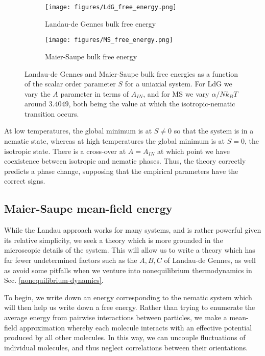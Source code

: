 \documentclass[reqno]{article}
\begin{document}
  \begin{figure}[h]
    \centering
    \begin{subfigure}{0.45\textwidth}
      \texttt{[image: figures/LdG\_free\_energy.png]}
      \caption{Landau-de Gennes bulk free energy}
      \label{fig:ldg-free-energy}
    \end{subfigure}
    \hfill
    \begin{subfigure}{0.45\textwidth}
      \texttt{[image: figures/MS\_free\_energy.png]}
      \caption{Maier-Saupe bulk free energy}
      \label{fig:ms-free-energy}
    \end{subfigure}
    \caption{Landau-de Gennes and Maier-Saupe bulk free energies as a function
      of the scalar order parameter $S$ for a uniaxial system. For LdG we vary
      the $A$ parameter in terms of $A_{IN}$, and for MS we vary $\alpha / N
      k_BT$ around $3.4049$, both being the value at which the
      isotropic-nematic transition occurs.}
  \end{figure}
  At low temperatures, the global minimum is at $S \neq 0$ so that the system is
  in a nematic state, whereas at high temperatures the global minimum is at $S =
  0$, the isotropic state.
  There is a cross-over at $A = A_{IN}$ at which point we have coexistence
  between isotropic and nematic phases.
  Thus, the theory correctly predicts a phase change, supposing that the
  empirical parameters have the correct signs.

  \subsection{Maier-Saupe mean-field energy}
  While the Landau approach works for many systems, and is rather powerful given
  its relative simplicity, we seek a theory which is more grounded in the
  microscopic details of the system.
  This will allow us to write a theory which has far fewer undetermined factors
  such as the $A, B, C$ of Landau-de Gennes, as well as avoid some pitfalls when
  we venture into nonequilibrium thermodynamics in Sec.
  \ref{nonequilibrium-dynamics}.
  
  To begin, we write down an energy corresponding to the nematic system
  which will then help us write down a free energy.
  Rather than trying to enumerate the average energy from pairwise interactions
  between particles, we make a mean-field approximation whereby each molecule
  interacts with an effective potential produced by all other molecules.
  In this way, we can uncouple fluctuations of individual molecules, and thus
  neglect correlations between their orientations.
\end{document}
